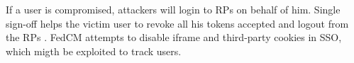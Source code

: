 If a user is compromised,
    attackers will login to RPs on behalf of him.
Single sign-off helps the victim user
 to revoke all his tokens accepted and logout from the RPs  \cite{GhasemisharifRC18}.
FedCM \cite{FedCM} attempts to disable iframe and third-party cookies in SSO, which migth be exploited to track users.



